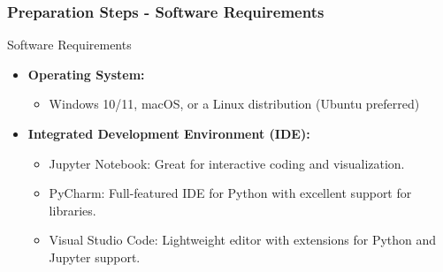 \documentclass{beamer}
\begin{document}
\begin{frame}[fragile]
    \frametitle{Preparation Steps - Software Requirements}
    \begin{block}{Software Requirements}
        \begin{itemize}
            \item \textbf{Operating System:}
            \begin{itemize}
                \item Windows 10/11, macOS, or a Linux distribution (Ubuntu preferred)
            \end{itemize}
            \item \textbf{Integrated Development Environment (IDE):}
            \begin{itemize}
                \item Jupyter Notebook: Great for interactive coding and visualization.
                \item PyCharm: Full-featured IDE for Python with excellent support for libraries.
                \item Visual Studio Code: Lightweight editor with extensions for Python and Jupyter support.
            \end{itemize}
        \end{itemize}
    \end{block}
\end{frame}
\end{document}
